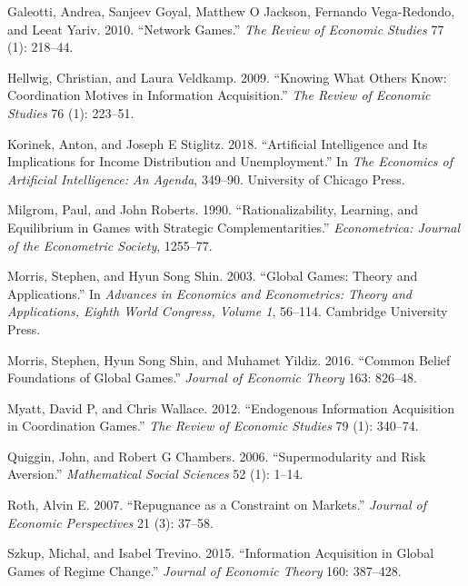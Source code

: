 \documentclass[
]{article}
\newlength{\cslhangindent}
\newenvironment{CSLReferences}[2] %
 {\begin{list}{}{%
  \setlength{\itemindent}{0pt}
  \setlength{\leftmargin}{0pt}
  \setlength{\parsep}{0pt}
  \ifodd #1
   \setlength{\leftmargin}{\cslhangindent}
   \setlength{\itemindent}{-1\cslhangindent}
  \fi
  \setlength{\itemsep}{#2\baselineskip}}}
 {\end{list}}
\theoremstyle{plain}
\theoremstyle{definition}
\theoremstyle{remark}
\begin{document}
\begin{CSLReferences}{1}{0}
Galeotti, Andrea, Sanjeev Goyal, Matthew O Jackson, Fernando
Vega-Redondo, and Leeat Yariv. 2010. {``Network Games.''} \emph{The
Review of Economic Studies} 77 (1): 218--44.

Hellwig, Christian, and Laura Veldkamp. 2009. {``Knowing What Others
Know: Coordination Motives in Information Acquisition.''} \emph{The
Review of Economic Studies} 76 (1): 223--51.

Korinek, Anton, and Joseph E Stiglitz. 2018. {``Artificial Intelligence
and Its Implications for Income Distribution and Unemployment.''} In
\emph{The Economics of Artificial Intelligence: An Agenda}, 349--90.
University of Chicago Press.

Milgrom, Paul, and John Roberts. 1990. {``Rationalizability, Learning,
and Equilibrium in Games with Strategic Complementarities.''}
\emph{Econometrica: Journal of the Econometric Society}, 1255--77.

Morris, Stephen, and Hyun Song Shin. 2003. {``Global Games: Theory and
Applications.''} In \emph{Advances in Economics and Econometrics: Theory
and Applications, Eighth World Congress, Volume 1}, 56--114. Cambridge
University Press.

Morris, Stephen, Hyun Song Shin, and Muhamet Yildiz. 2016. {``Common
Belief Foundations of Global Games.''} \emph{Journal of Economic Theory}
163: 826--48.

Myatt, David P, and Chris Wallace. 2012. {``Endogenous Information
Acquisition in Coordination Games.''} \emph{The Review of Economic
Studies} 79 (1): 340--74.

Quiggin, John, and Robert G Chambers. 2006. {``Supermodularity and Risk
Aversion.''} \emph{Mathematical Social Sciences} 52 (1): 1--14.

Roth, Alvin E. 2007. {``Repugnance as a Constraint on Markets.''}
\emph{Journal of Economic Perspectives} 21 (3): 37--58.

Szkup, Michal, and Isabel Trevino. 2015. {``Information Acquisition in
Global Games of Regime Change.''} \emph{Journal of Economic Theory} 160:
387--428.


\end{CSLReferences}
\end{document}
